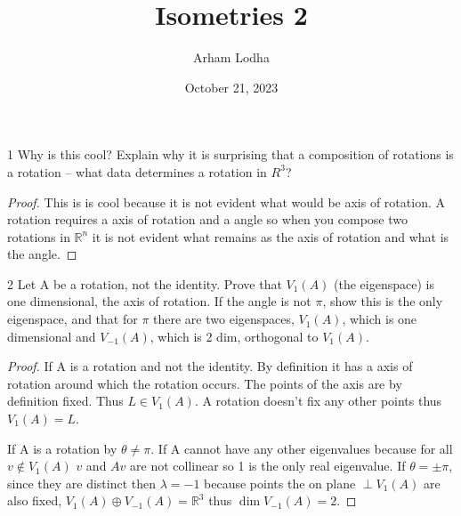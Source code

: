 \documentclass{article}
\newcommand{\R}{\mathbb{R}}
\begin{document}
\title{Isometries 2}
\author{Arham Lodha}%
\date{October 21, 2023}%
\maketitle

\begin{PROB}{1}\label{Problem 1.}
    Why is this cool? Explain why it is surprising that a composition of rotations is a rotation -- what data determines a rotation in $R^3$?
\end{PROB}
\begin{proof}
    This is is cool because it is not evident what would be axis of rotation. A rotation requires a axis of rotation and a angle so when you compose two rotations in $\R^n$ it is not evident what remains as the axis of rotation and what is the angle. 
\end{proof}

\bigskip

\begin{PROB}{2}\label{Problem 2.}
    Let A be a rotation, not the identity. Prove that $V_1(A)$ (the eigenspace) is one dimensional, the axis of rotation. If the angle is not $\pi$, show this is the only eigenspace, and that for $\pi$ there are two eigenspaces, $V_1(A)$, which is one dimensional and $V_{-1}(A)$, which is 2 dim, orthogonal to $V_1(A)$.
\end{PROB}
\begin{proof}
    If A is a rotation and not the identity. By definition it has a axis of rotation around which the rotation occurs. The points of the axis are by definition fixed. Thus $L \in V_1(A)$. A rotation doesn't fix any other points thus $V_1(A) = L$.

    If A is a rotation by $\theta \neq \pi$. If A cannot have any other eigenvalues because for all $v \not \in V_1(A)$ $v$ and $Av$ are not collinear so 1 is the only real eigenvalue. If $\theta = \pm \pi$, since they are distinct then $\lambda = -1$ because points the on plane $\perp V_1(A)$ are also fixed, $V_1(A) \oplus V_{-1}(A) = \R^3$ thus $\dim V_{-1}(A) = 2$.  
\end{proof}
\end{document}
